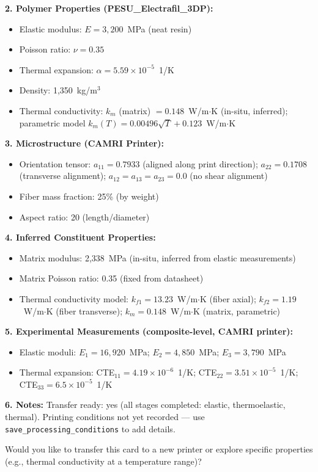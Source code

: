 \documentclass[preprint,review,10pt,number]{elsarticle}
\begin{document}
\begin{center}
\begin{tcolorbox}
\begin{tcolorbox}
\textbf{2. Polymer Properties (PESU\_Electrafil\_3DP):}
\begin{itemize}[leftmargin=1.2em, itemsep=0pt, topsep=2pt]
\item Elastic modulus: $E = 3{,}200$~MPa (neat resin)
\item Poisson ratio: $\nu = 0.35$
\item Thermal expansion: $\alpha = 5.59\times10^{-5}$~1/K
\item Density: 1{,}350~kg/m$^3$
\item Thermal conductivity: $k_m$ (matrix) $= 0.148$~W/m$\cdot$K (in-situ, inferred); parametric model $k_m(T) = 0.00496\sqrt{T} + 0.123$~W/m$\cdot$K
\end{itemize}

\textbf{3. Microstructure (CAMRI Printer):}
\begin{itemize}[leftmargin=1.2em, itemsep=0pt, topsep=2pt]
\item Orientation tensor: $a_{11} = 0.7933$ (aligned along print direction); $a_{22} = 0.1708$ (transverse alignment); $a_{12} = a_{13} = a_{23} = 0.0$ (no shear alignment)
\item Fiber mass fraction: 25\% (by weight)
\item Aspect ratio: 20 (length/diameter)
\end{itemize}

\textbf{4. Inferred Constituent Properties:}
\begin{itemize}[leftmargin=1.2em, itemsep=0pt, topsep=2pt]
\item Matrix modulus: 2{,}338~MPa (in-situ, inferred from elastic measurements)
\item Matrix Poisson ratio: 0.35 (fixed from datasheet)
\item Thermal conductivity model: $k_{f1} = 13.23$~W/m$\cdot$K (fiber axial); $k_{f2} = 1.19$~W/m$\cdot$K (fiber transverse); $k_m = 0.148$~W/m$\cdot$K (matrix, parametric)
\end{itemize}

\textbf{5. Experimental Measurements (composite-level, CAMRI printer):}
\begin{itemize}[leftmargin=1.2em, itemsep=0pt, topsep=2pt]
\item Elastic moduli: $E_1 = 16{,}920$~MPa; $E_2 = 4{,}850$~MPa; $E_3 = 3{,}790$~MPa
\item Thermal expansion: CTE$_{11} = 4.19\times10^{-6}$~1/K; CTE$_{22} = 3.51\times10^{-5}$~1/K; CTE$_{33} = 6.5\times10^{-5}$~1/K
\end{itemize}

\textbf{6. Notes:} Transfer ready: yes (all stages completed: elastic, thermoelastic, thermal). Printing conditions not yet recorded --- use \texttt{save\_processing\_conditions} to add details.
\vspace{4pt}

Would you like to transfer this card to a new printer or explore specific properties (e.g., thermal conductivity at a temperature range)?
\end{tcolorbox}

\end{tcolorbox}
\end{center}
\end{document}
